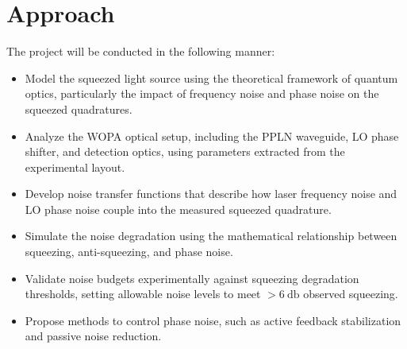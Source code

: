 \documentclass[colorlinks=true,pdfstartview=FitV,linkcolor=blue,
citecolor=red,urlcolor=magenta]{ligodoc}
\begin{document}
\section{Approach}
The project will be conducted in the following manner:

\begin{itemize}
    \item Model the squeezed light source using the theoretical framework of quantum optics, particularly the impact of frequency noise and phase noise on the squeezed quadratures.
    \item Analyze the WOPA optical setup, including the PPLN waveguide, LO phase shifter, and detection optics, using parameters extracted from the experimental layout.
    \item Develop noise transfer functions that describe how laser frequency noise and LO phase noise couple into the measured squeezed quadrature.
    \item Simulate the noise degradation using the mathematical relationship between squeezing, anti-squeezing, and phase noise.
    \item Validate noise budgets experimentally against squeezing degradation thresholds, setting allowable noise levels to meet $>\SI{6}{\decibel}$ observed squeezing.
    \item Propose methods to control phase noise, such as active feedback stabilization and passive noise reduction.
\end{itemize}

\end{document}
